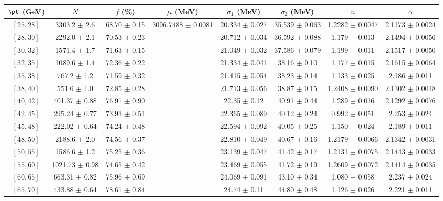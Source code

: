 \begin{tabular}{c||c|c|c|c|c|c|c}
$\pt$ (GeV) & $N$ & $f$ (\%) & $\mu$ (MeV) & $\sigma_1$ (MeV) & $\sigma_2$ (MeV) & $n$ & $\alpha$ \\
\hline
$[25, 28]$ & 3303.2 $\pm$ 2.6 & 68.70 $\pm$ 0.15 & \multirow{19}{*}{3096.7488 $\pm$ 0.0081} & 20.334 $\pm$ 0.027 & 35.539 $\pm$ 0.063 & 1.2282 $\pm$ 0.0047 & 2.1173 $\pm$ 0.0024\\
$[28, 30]$ & 2292.0 $\pm$ 2.1 & 70.53 $\pm$ 0.23 &  & 20.712 $\pm$ 0.034 & 36.592 $\pm$ 0.088 & 1.179 $\pm$ 0.013 & 2.1494 $\pm$ 0.0056\\
$[30, 32]$ & 1571.4 $\pm$ 1.7 & 71.63 $\pm$ 0.15 &  & 21.049 $\pm$ 0.032 & 37.586 $\pm$ 0.079 & 1.199 $\pm$ 0.011 & 2.1517 $\pm$ 0.0050\\
$[32, 35]$ & 1089.6 $\pm$ 1.4 & 72.36 $\pm$ 0.22 &  & 21.334 $\pm$ 0.041 & 38.16 $\pm$ 0.10 & 1.177 $\pm$ 0.015 & 2.1615 $\pm$ 0.0064\\
$[35, 38]$ & 767.2 $\pm$ 1.2 & 71.59 $\pm$ 0.32 &  & 21.415 $\pm$ 0.054 & 38.23 $\pm$ 0.14 & 1.133 $\pm$ 0.025 & 2.186 $\pm$ 0.011\\
$[38, 40]$ & 551.6 $\pm$ 1.0 & 72.85 $\pm$ 0.28 &  & 21.713 $\pm$ 0.056 & 38.87 $\pm$ 0.15 & 1.2408 $\pm$ 0.0090 & 2.1302 $\pm$ 0.0048\\
$[40, 42]$ & 401.37 $\pm$ 0.88 & 76.91 $\pm$ 0.90 &  & 22.35 $\pm$ 0.12 & 40.91 $\pm$ 0.44 & 1.289 $\pm$ 0.016 & 2.1292 $\pm$ 0.0076\\
$[42, 45]$ & 295.24 $\pm$ 0.77 & 73.93 $\pm$ 0.51 &  & 22.365 $\pm$ 0.089 & 40.12 $\pm$ 0.24 & 0.992 $\pm$ 0.051 & 2.253 $\pm$ 0.024\\
$[45, 48]$ & 222.02 $\pm$ 0.64 & 74.24 $\pm$ 0.48 &  & 22.594 $\pm$ 0.092 & 40.05 $\pm$ 0.25 & 1.150 $\pm$ 0.024 & 2.189 $\pm$ 0.011\\
$[48, 50]$ & 2188.6 $\pm$ 2.0 & 74.56 $\pm$ 0.37 &  & 22.810 $\pm$ 0.049 & 40.67 $\pm$ 0.16 & 1.2179 $\pm$ 0.0066 & 2.1342 $\pm$ 0.0031\\
$[50, 55]$ & 1586.6 $\pm$ 1.2 & 75.25 $\pm$ 0.36 &  & 23.139 $\pm$ 0.047 & 41.42 $\pm$ 0.17 & 1.2131 $\pm$ 0.0075 & 2.1443 $\pm$ 0.0033\\
$[55, 60]$ & 1021.73 $\pm$ 0.98 & 74.65 $\pm$ 0.42 &  & 23.469 $\pm$ 0.055 & 41.72 $\pm$ 0.19 & 1.2609 $\pm$ 0.0072 & 2.1414 $\pm$ 0.0035\\
$[60, 65]$ & 663.31 $\pm$ 0.82 & 75.96 $\pm$ 0.69 &  & 24.069 $\pm$ 0.091 & 43.10 $\pm$ 0.34 & 1.080 $\pm$ 0.058 & 2.237 $\pm$ 0.024\\
$[65, 70]$ & 433.88 $\pm$ 0.64 & 78.61 $\pm$ 0.84 &  & 24.74 $\pm$ 0.11 & 44.80 $\pm$ 0.48 & 1.126 $\pm$ 0.026 & 2.221 $\pm$ 0.011\\

\end{tabular}
